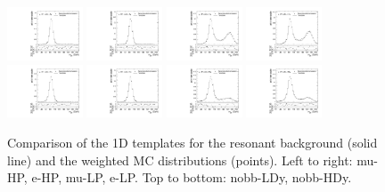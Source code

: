 \begin{figure}[htbp]
  \centering
  \includegraphics[width=0.2\textwidth]{fig/2Dfit/templateVsReco_res_r0_MJ_mu_HP_nobb_LDy.pdf}
  \includegraphics[width=0.2\textwidth]{fig/2Dfit/templateVsReco_res_r0_MJ_e_HP_nobb_LDy.pdf}
  \includegraphics[width=0.2\textwidth]{fig/2Dfit/templateVsReco_res_r0_MJ_mu_LP_nobb_LDy.pdf}
  \includegraphics[width=0.2\textwidth]{fig/2Dfit/templateVsReco_res_r0_MJ_e_LP_nobb_LDy.pdf}\\
  \includegraphics[width=0.2\textwidth]{fig/2Dfit/templateVsReco_res_r0_MJ_mu_HP_nobb_HDy.pdf}
  \includegraphics[width=0.2\textwidth]{fig/2Dfit/templateVsReco_res_r0_MJ_e_HP_nobb_HDy.pdf}
  \includegraphics[width=0.2\textwidth]{fig/2Dfit/templateVsReco_res_r0_MJ_mu_LP_nobb_HDy.pdf}
  \includegraphics[width=0.2\textwidth]{fig/2Dfit/templateVsReco_res_r0_MJ_e_LP_nobb_HDy.pdf}\\
  \caption{
    Comparison of the 1D \MJ templates for the resonant background (solid line) and the weighted MC distributions (points).
    Left to right: mu-HP, e-HP, mu-LP, e-LP.
    Top to bottom: nobb-LDy, nobb-HDy.
  }
  \label{fig:1dtemplateVsReco_res_MJ_Run2}
\end{figure}

